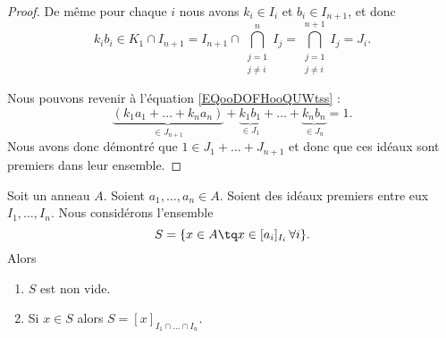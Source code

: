 \begin{proof}
	De même pour chaque \( i\) nous avons \( k_i\in I_i\) et \( b_i\in I_{n+1}\), et donc
	\begin{equation}
		k_ib_i\in K_1\cap I_{n+1}=I_{n+1}\cap\bigcap_{\substack{ j=1 \\ j\neq i }  }^nI_j=\bigcap_{\substack{ j=1 \\ j\neq i }  }^{n+1}I_j=J_i.
	\end{equation}

	Nous pouvons revenir à l'équation \eqref{EQooDOFHooQUWtss} :
	\begin{equation}
		\underbrace{(k_1a_1+\ldots+k_na_n)}_{\in J_{n+1}}+ \underbrace{k_1b_1}_{\in J_1}+\ldots+\underbrace{k_nb_n}_{\in J_n}=1.
	\end{equation}
	Nous avons donc démontré que \( 1\in J_1+\ldots+J_{n+1}\) et donc que ces idéaux sont premiers dans leur ensemble.
\end{proof}

\begin{proposition}	\label{PROPooKWZLooCHhSjs}
	Soit un anneau \( A\). Soient \( a_1,\ldots,a_n\in A\). Soient des idéaux premiers entre eux \( I_1,\ldots,I_n\). Nous considérons l'ensemble
	\begin{equation}
		S=\{ x\in A\tq x\in[a_i]_{I_i}\,\forall i \}.
	\end{equation}
	Alors
	\begin{enumerate}
		\item		\label{ITEMooTGOEooZfsiKG}
		      \( S\) est non vide.
		\item		\label{ITEMooCECDooQzGovx}
		      Si \( x\in S\) alors \( S=[x]_{I_1\cap\ldots\cap I_n}\).
	\end{enumerate}
\end{proposition}

